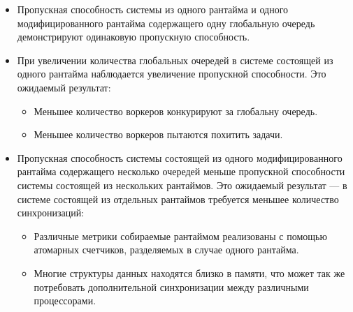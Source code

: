 \begin{itemize}
    \item Пропускная способность системы из одного рантайма и одного модифицированного рантайма содержащего одну глобальную очередь демонстрируют одинаковую пропускную способность.
    \item При увеличении количества глобальных очередей в системе состоящей из одного рантайма наблюдается увеличение пропускной способности. Это ожидаемый результат:
    \begin{itemize}
        \item Меньшее количество воркеров конкурируют за глобальну очередь.
        \item Меньшее количество воркеров пытаются похитить задачи.
    \end{itemize}
    \item Пропускная способность системы состоящей из одного модифицированного рантайма содержащего несколько очередей меньше пропускной способности системы состоящей из нескольких рантаймов. Это ожидаемый результат --- в системе состоящей из отдельных рантаймов требуется меньшее количество синхронизаций:
    \begin{itemize}
        \item Различные метрики собираемые рантаймом реализованы с помощью атомарных счетчиков, разделяемых в случае одного рантайма.
        \item Многие структуры данных находятся близко в памяти, что может так же потребовать дополнительной синхронизации между различными процессорами.
    \end{itemize}
\end{itemize}
